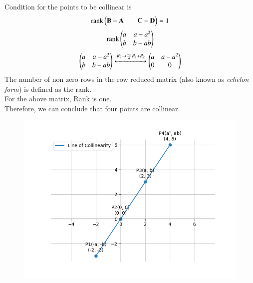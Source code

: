 \documentclass[journal]{IEEEtran}
\begin{document}
Condition for the points to be collinear is
\begin{align}
    \text{rank}\begin{pmatrix}\mathbf{B} - \mathbf{A} & &\mathbf{C} - \mathbf{D}\end{pmatrix} = 1
\end{align}
\begin{align}
    \text{rank}\begin{pmatrix}a & a-a^2\\b & b-ab\end{pmatrix}
\end{align}
\begin{align}
	\begin{pmatrix}a &  a-a^2\\ b & b-ab\end{pmatrix} \xleftrightarrow[]{R_2 \rightarrow {\frac{-b}{a}R_1 + R_2}} \begin{pmatrix}a & a-a^2 \\ 0 & 0\end{pmatrix}  
\end{align}
The number of non zero rows in the row reduced matrix (also known as {\em echelon form}) is defined as the rank.\\
For the above matrix, Rank is one.\\
Therefore, we can conclude that four points are collinear.
\newpage
 \begin{figure}
    \centering
    \includegraphics[width=0.9\columnwidth]{figs/Figure_1.png}
    \label{fig:placeholder}
    \caption{}
\end{figure}
\end{document}
